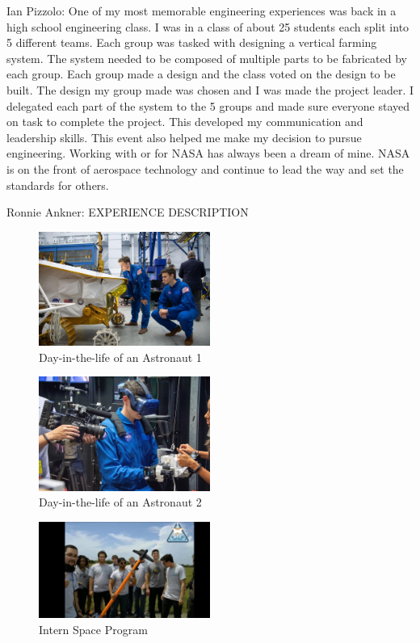\documentclass{article}
\begin{document}
Ian Pizzolo: One of my most memorable engineering experiences was back 
in a high school engineering class. I was in a class of about 25 
students each split into 5 different teams. Each group was tasked with 
designing a vertical farming system. The system needed to be composed of 
multiple parts to be fabricated by each group. Each group made a design 
and the class voted on the design to be built. The design my group made 
was chosen and I was made the project leader. I delegated each part of 
the system to the 5 groups and made sure everyone stayed on task to 
complete the project. This developed my communication and leadership 
skills. This event also helped me make my decision to pursue 
engineering. Working with or for NASA has always been a dream of mine. 
NASA is on the front of aerospace technology and continue to lead the 
way and set the standards for others.

Ronnie Ankner: EXPERIENCE DESCRIPTION

\begin{figure}[!htb]
  \centering
  \includegraphics[width=0.5\textwidth]{assets/staringatrover.jpg}
  \caption{Day-in-the-life of an Astronaut 1}
  \label{fig:staringatrover}
\end{figure}

\begin{figure}[!htb]
  \centering
  \includegraphics[width=0.5\textwidth]{assets/vrtest.png}
  \caption{Day-in-the-life of an Astronaut 2}
  \label{fig:vrtest}
\end{figure}

\begin{figure}[!htb]
  \centering
  \includegraphics[width=0.5\textwidth]{assets/ronnieandplane.png}
  \caption{Intern Space Program}
  \label{fig:ronnieandplane}
\end{figure}
\end{document}
